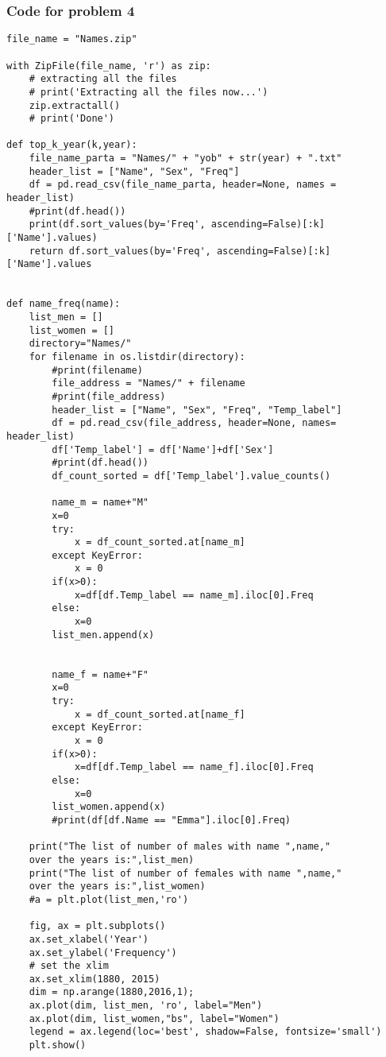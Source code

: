 \documentclass[12pt]{article}%
\begin{document}
\subsubsection*{Code for problem 4}
\begin{lstlisting}
file_name = "Names.zip"

with ZipFile(file_name, 'r') as zip: 
    # extracting all the files 
    # print('Extracting all the files now...') 
    zip.extractall() 
    # print('Done') 

def top_k_year(k,year):
    file_name_parta = "Names/" + "yob" + str(year) + ".txt"
    header_list = ["Name", "Sex", "Freq"]
    df = pd.read_csv(file_name_parta, header=None, names = header_list)
    #print(df.head())
    print(df.sort_values(by='Freq', ascending=False)[:k]['Name'].values)
    return df.sort_values(by='Freq', ascending=False)[:k]['Name'].values

    
def name_freq(name):
    list_men = []
    list_women = []
    directory="Names/"
    for filename in os.listdir(directory):
        #print(filename)
        file_address = "Names/" + filename
        #print(file_address)
        header_list = ["Name", "Sex", "Freq", "Temp_label"]
        df = pd.read_csv(file_address, header=None, names= header_list)
        df['Temp_label'] = df['Name']+df['Sex']
        #print(df.head())
        df_count_sorted = df['Temp_label'].value_counts()
        
        name_m = name+"M"
        x=0
        try:
            x = df_count_sorted.at[name_m]
        except KeyError:
            x = 0
        if(x>0):
            x=df[df.Temp_label == name_m].iloc[0].Freq
        else:
            x=0
        list_men.append(x)
        
        
        name_f = name+"F"
        x=0
        try:
            x = df_count_sorted.at[name_f]
        except KeyError:
            x = 0
        if(x>0):
            x=df[df.Temp_label == name_f].iloc[0].Freq
        else:
            x=0
        list_women.append(x)
        #print(df[df.Name == "Emma"].iloc[0].Freq)
        
    print("The list of number of males with name ",name," 
    over the years is:",list_men)
    print("The list of number of females with name ",name," 
    over the years is:",list_women)
    #a = plt.plot(list_men,'ro')
    
    fig, ax = plt.subplots()
    ax.set_xlabel('Year') 
    ax.set_ylabel('Frequency')
    # set the xlim
    ax.set_xlim(1880, 2015)
    dim = np.arange(1880,2016,1);
    ax.plot(dim, list_men, 'ro', label="Men") 
    ax.plot(dim, list_women,"bs", label="Women")
    legend = ax.legend(loc='best', shadow=False, fontsize='small')
    plt.show()
    

\end{lstlisting}
\end{document}
